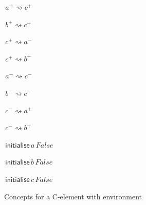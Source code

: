 \documentclass[british,compsoc]{IEEEtran}
\begin{document}
\begin{figure}[h]
\begin{minipage}[h]{1\columnwidth}%
\begin{center}
$\,a^{+}\rightsquigarrow c^{+}$
\par\end{center}

\begin{center}
$\,b^{+}\rightsquigarrow c^{+}$
\par\end{center}

\begin{center}
$\,c^{+}\rightsquigarrow a^{-}$
\par\end{center}

\begin{center}
$\,c^{+}\rightsquigarrow b^{-}$
\par\end{center}

\begin{center}
$\,a^{-}\rightsquigarrow c^{-}$
\par\end{center}

\begin{center}
$\,b^{-}\rightsquigarrow c^{-}$
\par\end{center}

\begin{center}
$\,c^{-}\rightsquigarrow a^{+}$
\par\end{center}

\begin{center}
$\,c^{-}\rightsquigarrow b^{+}$
\par\end{center}

\begin{center}
$\,\mathsf{initialise}\,a \,False $
\par\end{center}

\begin{center}
$\,\mathsf{initialise}\,b \,False $
\par\end{center}

\begin{center}
$\,\mathsf{initialise}\,c \,False $
\par\end{center}

\end{minipage}
\caption{Concepts for a C-element with environment\label{fig:c-element-concepts}}
\end{figure}
\end{document}
